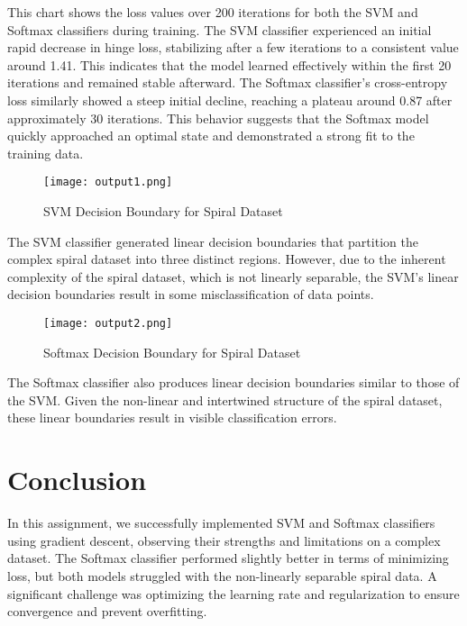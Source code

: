 \documentclass{article}
\begin{document}
This chart shows the loss values over 200 iterations for both the SVM and Softmax classifiers during training. The SVM classifier experienced an initial rapid decrease in hinge loss, stabilizing after a few iterations to a consistent value around 1.41. This indicates that the model learned effectively within the first 20 iterations and remained stable afterward. The Softmax classifier’s cross-entropy loss similarly showed a steep initial decline, reaching a plateau around 0.87 after approximately 30 iterations. This behavior suggests that the Softmax model quickly approached an optimal state and demonstrated a strong fit to the training data.


\begin{figure}[H]
    \centering
    \texttt{[image: output1.png]}
    \caption{SVM Decision Boundary for Spiral Dataset}
    \label{fig:svm_decision_boundary}
\end{figure}

The SVM classifier generated linear decision boundaries that partition the complex spiral dataset into three distinct regions. However, due to the inherent complexity of the spiral dataset, which is not linearly separable, the SVM’s linear decision boundaries result in some misclassification of data points.

\begin{figure}[H]
    \centering
    \texttt{[image: output2.png]}
    \caption{Softmax Decision Boundary for Spiral Dataset}
    \label{fig:softmax_decision_boundary}
\end{figure}

The Softmax classifier also produces linear decision boundaries similar to those of the SVM. Given the non-linear and intertwined structure of the spiral dataset, these linear boundaries result in visible classification errors.

\section{Conclusion}
In this assignment, we successfully implemented SVM and Softmax classifiers using gradient descent, observing their strengths and limitations on a complex dataset. The Softmax classifier performed slightly better in terms of minimizing loss, but both models struggled with the non-linearly separable spiral data. A significant challenge was optimizing the learning rate and regularization to ensure convergence and prevent overfitting.
\end{document}
